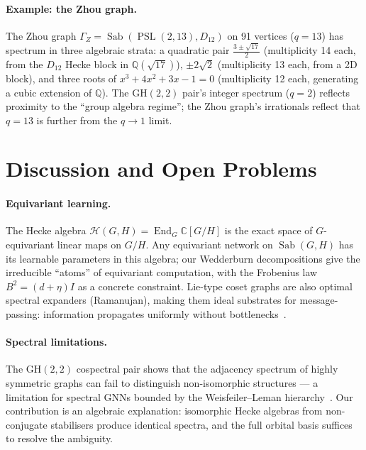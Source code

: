 \documentclass[mlmain]{jmlr}
\newcommand{\Sab}{\operatorname{Sab}}
\newcommand{\PSL}{\operatorname{PSL}}
\newcommand{\GH}{\mathrm{GH}}
\newcommand{\HH}{\mathcal{H}}
\newcommand{\CC}{\mathbb{C}}
\newcommand{\Q}{\mathbb{Q}}
\begin{document}
\paragraph{Example: the Zhou graph.}
The Zhou graph $\Gamma_Z = \Sab(\PSL(2,13), D_{12})$ on 91
vertices ($q = 13$) has spectrum in three algebraic strata:
a quadratic pair $\frac{3 \pm \sqrt{17}}{2}$ (multiplicity 14
each, from the $D_{12}$ Hecke block in $\Q(\sqrt{17})$),
$\pm 2\sqrt{2}$ (multiplicity 13 each, from a 2D block),
and three roots of $x^3 + 4x^2 + 3x - 1 = 0$ (multiplicity
12 each, generating a cubic extension of $\Q$).
The $\GH(2,2)$ pair's integer spectrum ($q = 2$) reflects
proximity to the ``group algebra regime'';
the Zhou graph's irrationals reflect that $q = 13$ is
further from the $q \to 1$ limit.


\section{Discussion and Open Problems}
\label{sec:discussion}

\paragraph{Equivariant learning.}
The Hecke algebra $\HH(G,H) = \operatorname{End}_G \CC[G/H]$
is the exact space of $G$-equivariant linear maps on $G/H$.
Any equivariant network on $\Sab(G,H)$ has its learnable
parameters in this algebra; our Wedderburn decompositions
give the irreducible ``atoms'' of equivariant computation,
with the Frobenius law $B^2 = (d + \eta)I$ as a concrete
constraint.  Lie-type coset graphs are also optimal spectral
expanders (Ramanujan), making them ideal substrates for
message-passing: information propagates uniformly without
bottlenecks~\citep{alon1986, hoory2006}.

\paragraph{Spectral limitations.}
The $\GH(2,2)$ cospectral pair shows that the adjacency spectrum
of highly symmetric graphs can fail to distinguish
non-isomorphic structures --- a limitation for spectral
GNNs bounded by the Weisfeiler--Leman
hierarchy~\citep{weisfeiler1968, xu2019}.
Our contribution is an algebraic explanation: isomorphic
Hecke algebras from non-conjugate stabilisers produce
identical spectra, and the full orbital basis suffices to
resolve the ambiguity.
\end{document}
